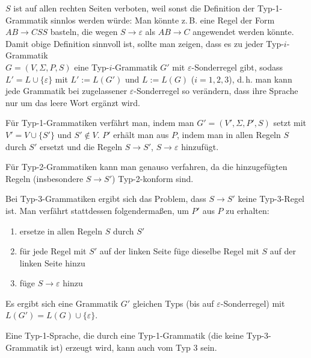 \begin{Bem}
    $S$ ist auf allen rechten Seiten verboten, weil sonst die Definition
    der Typ-1-Grammatik sinnlos werden würde:
    Man könnte z.\,B. eine Regel der Form $AB \rightarrow CSS$
    basteln, die wegen $S \rightarrow \varepsilon$ als $AB \rightarrow C$
    angewendet werden könnte.\\
    Damit obige Definition sinnvoll ist, sollte man zeigen,
    dass es zu jeder Typ-$i$-Grammatik\\
    $G = (V, \Sigma, P, S)$ eine Typ-$i$-Grammatik $G'$ mit
    $\varepsilon$-Sonderregel gibt, sodass
    $L' = L \cup \{\varepsilon\}$ mit $L' := L(G')$ und $L := L(G)$
    ($i = 1, 2, 3$), d.\,h. man kann jede Grammatik bei zugelassener
    $\varepsilon$-Sonderregel so verändern, dass ihre Sprache nur um
    das leere Wort ergänzt wird.
    
    Für Typ-1-Grammatiken verfährt man, indem man
    $G' = (V', \Sigma, P', S)$ setzt mit $V' = V \cup \{S'\}$
    und $S' \notin V$.
    $P'$ erhält man aus $P$, indem man in allen Regeln $S$ durch $S'$ ersetzt
    und die Regeln $S \rightarrow S'$, $S \rightarrow \varepsilon$
    hinzufügt.
    
    Für Typ-2-Grammatiken kann man genauso verfahren, da
    die hinzugefügten Regeln (insbesondere $S \rightarrow S'$)
    Typ-2-konform sind.
    
    Bei Typ-3-Grammatiken ergibt sich das Problem, dass $S \rightarrow S'$
    keine Typ-3-Regel ist.
    Man verfährt stattdessen folgendermaßen, um $P'$ aus $P$ zu erhalten:
    \begin{enumerate}
        \item
        ersetze in allen Regeln $S$ durch $S'$
        
        \item
        für jede Regel mit $S'$ auf der linken Seite füge dieselbe Regel
        mit $S$ auf der linken Seite hinzu
        
        \item
        füge $S \rightarrow \varepsilon$ hinzu
    \end{enumerate}
    Es ergibt sich eine Grammatik $G'$ gleichen Typs
    (bis auf $\varepsilon$-Sonderregel) mit
    $L(G') = L(G) \cup \{\varepsilon\}$.
\end{Bem}

\linie

\begin{Bem}
    Eine Typ-1-Sprache, die durch eine Typ-1-Grammatik
    (die keine Typ-3-Grammatik ist) erzeugt wird,
    kann auch vom Typ 3 sein.
\end{Bem}

